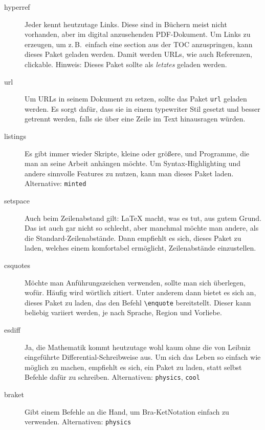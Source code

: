 \documentclass[11pt,
               a4paper,
               parskip=half,
               ]{scrartcl}
\newcommand{\zB}{z.\,B.\xspace}
\newcommand{\textsw}[1]{\texttt{#1}} %
\begin{document}
\begin{description}
  \item[hyperref] Jeder kennt heutzutage Links.
    Diese sind in Büchern meist nicht vorhanden,
    aber im digital anzusehenden PDF-Dokument.
    Um Links zu erzeugen,
    um \zB~einfach eine section aus der TOC anzuspringen,
    kann dieses Paket geladen werden.
    Damit werden URLs, wie auch Referenzen, clickable.
    Hinweis: Dieses Paket sollte als \emph{letztes} geladen werden.

  \item[url] Um URLs in seinem Dokument zu setzen,
    sollte das Paket \textsw{url} geladen werden.
    Es sorgt dafür, dass sie in einem typewriter Stil gesetzt
    und besser getrennt werden,
    falls sie über eine Zeile im Text hinausragen würden.

  \item[listings] Es gibt immer wieder Skripte,
    kleine oder größere, und Programme,
    die man an seine Arbeit anhängen möchte.
    Um Syntax-Highlighting und andere sinnvolle
    Features zu nutzen, kann man dieses Paket laden.
    Alternative: \textsw{minted}

  \item[setspace] Auch beim Zeilenabstand gilt:
    \LaTeX{} macht, was es tut, aus gutem Grund.
    Das ist auch gar nicht so schlecht,
    aber manchmal möchte man andere,
    als die Standard-Zeilenabstände.
    Dann empfiehlt es sich, dieses Paket zu laden,
    welches einem komfortabel ermöglicht,
    Zeilenabstände einzustellen.

  \item[csquotes] Möchte man Anführungszeichen verwenden,
    sollte man sich überlegen, wofür.
    Häufig wird wörtlich zitiert. Unter anderem dann bietet es sich an,
    dieses Paket zu laden, das den Befehl \verb+\enquote+ bereitstellt.
    Dieser kann beliebig variiert werden,
    je nach Sprache, Region und Vorliebe.

  \item[esdiff] Ja, die Mathematik kommt heutzutage
    wohl kaum ohne die von Leibniz eingeführte
    Differential-Schreibweise aus.
    Um sich das Leben so einfach wie möglich zu machen,
    empfiehlt es sich, ein Paket zu laden,
    statt selbst Befehle dafür zu schreiben.
    Alternativen: \textsw{physics}, \textsw{cool}

  \item[braket] Gibt einem Befehle an die Hand,
    um \textlangle Bra-Ket\textrangle Notation einfach zu verwenden.
    Alternativen: \textsw{physics}


\end{description}
\end{document}
